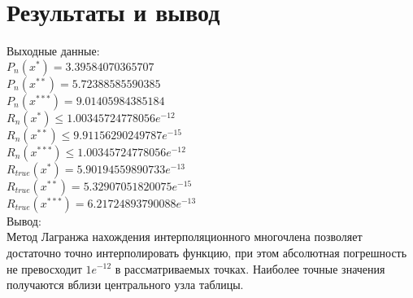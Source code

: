 \documentclass[10pt]{scrartcl}
\begin{document}
\section*{Результаты и вывод}\noindent
Выходные данные:\\
$P_n(x^*) = 3.39584070365707$\\
$P_n(x^{**}) = 5.72388585590385$\\
$P_n(x^{***})= 9.01405984385184$\\
$R_n(x^*) \leq 1.00345724778056e^{-12}$\\
$R_n(x^{**}) \leq 9.91156290249787e^{-15}$\\
$R_n(x^{***}) \leq 1.00345724778056e^{-12}$\\
$R_{true}(x^*) = 5.90194559890733e^{-13}$\\
$R_{true}(x^{**}) = 5.32907051820075e^{-15}$\\
$R_{true}(x^{***}) = 6.21724893790088e^{-13}$\\
Вывод:\\
Метод Лагранжа нахождения интерполяционного многочлена позволяет достаточно точно интерполировать функцию, при этом абсолютная погрешность не превосходит $1e^{-12}$ 
в рассматриваемых точках. Наиболее точные значения получаются вблизи центрального узла
таблицы.
\end{document}
